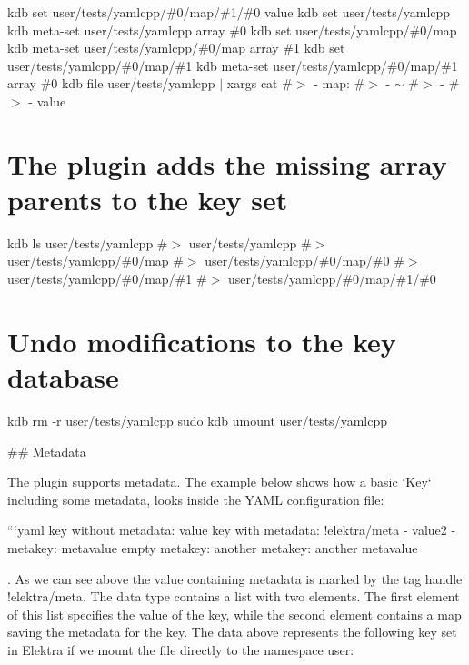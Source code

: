 kdb set user/tests/yamlcpp/\#0/map/\#1/\#0 value kdb set user/tests/yamlcpp kdb meta-\/set user/tests/yamlcpp array \textquotesingle{}\#0\textquotesingle{} kdb set user/tests/yamlcpp/\#0/map kdb meta-\/set user/tests/yamlcpp/\#0/map array \textquotesingle{}\#1\textquotesingle{} kdb set user/tests/yamlcpp/\#0/map/\#1 kdb meta-\/set user/tests/yamlcpp/\#0/map/\#1 array \textquotesingle{}\#0\textquotesingle{} kdb file user/tests/yamlcpp $\vert$ xargs cat \#$>$ -\/ map\+: \#$>$ -\/ $\sim$ \#$>$ -\/ \#$>$ -\/ value\hypertarget{autotoc_md865_autotoc_md907}{}\section{The plugin adds the missing array parents to the key set}\label{autotoc_md865_autotoc_md907}
kdb ls user/tests/yamlcpp \#$>$ user/tests/yamlcpp \#$>$ user/tests/yamlcpp/\#0/map \#$>$ user/tests/yamlcpp/\#0/map/\#0 \#$>$ user/tests/yamlcpp/\#0/map/\#1 \#$>$ user/tests/yamlcpp/\#0/map/\#1/\#0\hypertarget{autotoc_md865_autotoc_md908}{}\section{Undo modifications to the key database}\label{autotoc_md865_autotoc_md908}
kdb rm -\/r user/tests/yamlcpp sudo kdb umount user/tests/yamlcpp 
\begin{DoxyCode}
## Metadata

The plugin supports metadata. The example below shows how a basic `Key` including some metadata, looks
       inside the YAML configuration file:

```yaml
key without metadata: value
key with metadata: !elektra/meta
  - value2
  - metakey: metavalue
    empty metakey:
    another metakey: another metavalue
\end{DoxyCode}


. As we can see above the value containing metadata is marked by the tag handle {\ttfamily !elektra/meta}. The data type contains a list with two elements. The first element of this list specifies the value of the key, while the second element contains a map saving the metadata for the key. The data above represents the following key set in Elektra if we mount the file directly to the namespace {\ttfamily user}\+:

